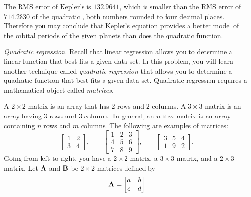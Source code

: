 \documentclass[a4paper,oneside,12pt]{article}
\begin{document}
\begin{problem}
{\begin{solution}
The RMS error of Kepler's  is
$132.9641$, which is smaller than the RMS error of $714.2830$ of the
quadratic , both numbers
rounded to four decimal places.  Therefore you may conclude that
Kepler's equation provides a better model of the orbital periods of
the given planets than does the quadratic function.
\end{solution}
}{}

\item\emph{Quadratic regression.}
  Recall that linear regression allows you to determine a linear
  function that best fits a given data set.  In this problem, you will
  learn another technique called \emph{quadratic regression} that
  allows you to determine a quadratic function that best fits a given
  data set.  Quadratic regression requires a mathematical object
  called \emph{matrices}.
  \begin{packedenum}
  \item\label{subprob:quadratic_applications:matrix_sum}
    A $2 \times 2$ matrix is an array that has $2$ rows and $2$
    columns.  A $3 \times 3$ matrix is an array having $3$ rows and
    $3$ columns.  In general, an $n \times m$ matrix is an array
    containing $n$ rows and $m$ columns.  The following are examples
    of matrices:
    \[
    \begin{bmatrix}
    1 & 2 \\
    3 & 4
    \end{bmatrix},
    \qquad
    \begin{bmatrix}
    1 & 2 & 3 \\
    4 & 5 & 6 \\
    7 & 8 & 9
    \end{bmatrix},
    \qquad
    \begin{bmatrix}
    3 & 5 & 4 \\
    1 & 9 & 2
    \end{bmatrix}.
    \]
    Going from left to right, you have a $2 \times 2$ matrix, a
    $3 \times 3$ matrix, and a $2 \times 3$ matrix.  Let $\textbf{A}$ and
    $\textbf{B}$ be $2 \times 2$ matrices defined by
    \begin{equation}
    \label{eqn:quadratic_applications:2x2_matrices}
    \matA
    =
    \begin{bmatrix}
    a & b \\
    c & d
    \end{bmatrix}

\end{equation}
\end{packedenum}
\end{problem}
\end{document}
